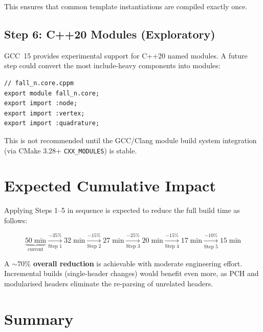 This ensures that common template instantiations are compiled
exactly once.


\subsection{Step 6: C++20 Modules (Exploratory)}
\label{sec:build-modules}

GCC~15 provides experimental support for C++20 named modules.
A future step could convert the most include-heavy components into
modules:

\begin{lstlisting}
// fall_n.core.cppm
export module fall_n.core;
export import :node;
export import :vertex;
export import :quadrature;
\end{lstlisting}

This is not recommended until the GCC/Clang module build system
integration (via CMake 3.28+ \texttt{CXX\_MODULES}) is stable.


\section{Expected Cumulative Impact}
\label{sec:build-impact}

Applying Steps 1--5 in sequence is expected to reduce the full build
time as follows:

\begin{equation*}
  \underbrace{50\;\text{min}}_{\text{current}}
  \xrightarrow[\text{Step 1}]{-35\%}
  32\;\text{min}
  \xrightarrow[\text{Step 2}]{-15\%}
  27\;\text{min}
  \xrightarrow[\text{Step 3}]{-25\%}
  20\;\text{min}
  \xrightarrow[\text{Step 4}]{-15\%}
  17\;\text{min}
  \xrightarrow[\text{Step 5}]{-10\%}
  15\;\text{min}
\end{equation*}

\noindent
A \textbf{${\sim}70\%$ overall reduction} is achievable with moderate
engineering effort.  Incremental builds (single-header changes) would
benefit even more, as PCH and modularised headers eliminate the
re-parsing of unrelated headers.


\section{Summary}
\label{sec:build-summary}


